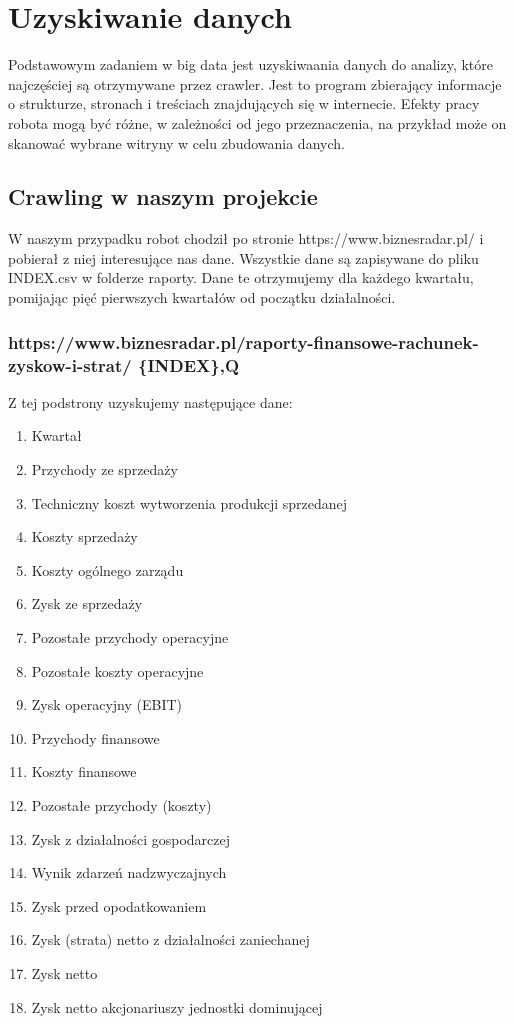 \section{Uzyskiwanie danych}

Podstawowym zadaniem w big data jest uzyskiwaania danych do analizy, które najczęściej są otrzymywane przez crawler. Jest to program zbierający informacje o strukturze, stronach i treściach znajdujących się w internecie. Efekty pracy robota mogą być różne, w zależności od jego przeznaczenia, na przykład może on skanować wybrane witryny w celu zbudowania danych.

\subsection{Crawling w naszym projekcie}

W naszym przypadku robot chodził po stronie https://www.biznesradar.pl/ i pobierał z niej interesujące nas dane.
Wszystkie dane są zapisywane do pliku {INDEX}.csv w folderze raporty. Dane te otrzymujemy dla każdego kwartału, pomijając pięć pierwszych kwartałów od początku działalności.

\subsubsection{https://www.biznesradar.pl/raporty-finansowe-rachunek-zyskow-i-strat/ \{INDEX\},Q}
Z tej podstrony uzyskujemy następujące dane:
\begin{enumerate}
  \item Kwartał
  \item Przychody ze sprzedaży
  \item Techniczny koszt wytworzenia produkcji sprzedanej
  \item Koszty sprzedaży
  \item Koszty ogólnego zarządu
  \item Zysk ze sprzedaży
  \item Pozostałe przychody operacyjne
  \item Pozostałe koszty operacyjne
  \item Zysk operacyjny (EBIT)
  \item Przychody finansowe
  \item Koszty finansowe
  \item Pozostałe przychody (koszty)
  \item Zysk z działalności gospodarczej
  \item Wynik zdarzeń nadzwyczajnych
  \item Zysk przed opodatkowaniem
  \item Zysk (strata) netto z działalności zaniechanej
  \item Zysk netto
  \item Zysk netto akcjonariuszy jednostki dominującej
\end{enumerate}

